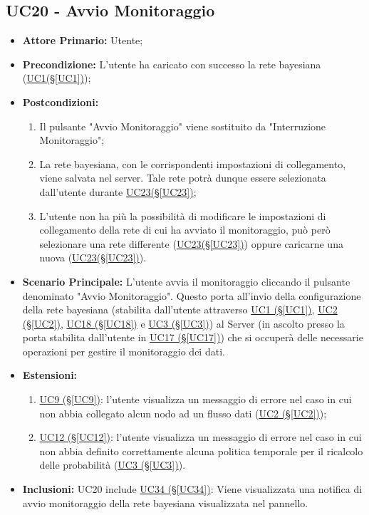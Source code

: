 \pagebreak

\subsection{UC20 - Avvio Monitoraggio}\label{UC20}

\begin{itemize}
	\item \textbf{Attore Primario:} Utente;
	\item \textbf{Precondizione:} L'utente ha caricato con successo la rete bayesiana (\hyperref[UC1]{UC1(§\ref*{UC1})});
	\item \textbf{Postcondizioni:}
	\begin{enumerate}
		\item Il pulsante "Avvio Monitoraggio" viene sostituito da "Interruzione Monitoraggio";
		\item La rete bayesiana, con le corrispondenti impostazioni di collegamento, viene salvata nel server. Tale rete potrà dunque essere selezionata dall'utente durante \hyperref[UC23]{UC23(§\ref*{UC23})};
		\item L'utente non ha più la possibilità di modificare le impostazioni di collegamento della rete di cui ha avviato il monitoraggio, può però selezionare una rete differente (\hyperref[UC23]{UC23(§\ref*{UC23})}) oppure caricarne una nuova (\hyperref[UC23]{UC23(§\ref*{UC23})}).
	\end{enumerate}
	\item \textbf{Scenario Principale:} L'utente avvia il monitoraggio cliccando il pulsante denominato "Avvio Monitoraggio". Questo porta all'invio della configurazione della rete bayesiana (stabilita dall'utente attraverso \hyperref[UC1]{UC1 (§\ref*{UC1})}, \hyperref[UC2]{UC2 (§\ref*{UC2})}, \hyperref[UC18]{UC18 (§\ref*{UC18})} e \hyperref[UC3]{UC3 (§\ref*{UC3})}) al Server (in ascolto presso la porta stabilita dall'utente in \hyperref[UC17]{UC17 (§\ref*{UC17})}) che si occuperà delle necessarie operazioni per gestire il monitoraggio dei dati.
	\item \textbf{Estensioni:}
	\begin{enumerate}
		\item \hyperref[UC9]{UC9 (§\ref*{UC9})}: l'utente visualizza un messaggio di errore nel caso in cui non abbia collegato alcun nodo ad un flusso dati (\hyperref[UC2]{UC2 (§\ref*{UC2})});
		\item \hyperref[UC12]{UC12 (§\ref*{UC12})}: l'utente visualizza un messaggio di errore nel caso in cui non abbia definito correttamente alcuna politica temporale per il ricalcolo delle probabilità (\hyperref[UC3]{UC3 (§\ref*{UC3})}).
	\end{enumerate}
	\item \textbf{Inclusioni:} UC20 include \hyperref[UC34]{UC34 (§\ref*{UC34})}: Viene visualizzata una notifica di avvio monitoraggio della rete bayesiana visualizzata nel pannello.
\end{itemize}

